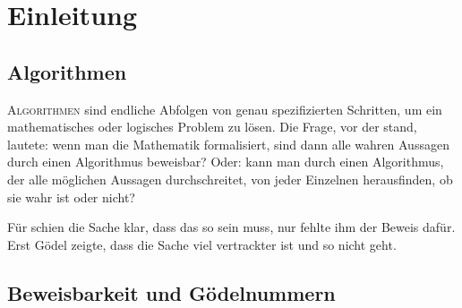 \section*{Einleitung}

\let\originalthefootnote\thefootnote
\renewcommand*{\thefootnote}{\fnsymbol{footnote}}

\subsection*{Algorithmen}

\lettrine[nindent=0em]{\color{purple}A}{lgorithmen} sind endliche Abfolgen von
genau spezifizierten Schritten, um ein mathematisches oder logisches Problem zu lösen. 
Die Frage, vor der  stand, lautete: wenn man die Mathematik formalisiert, 
sind dann alle wahren Aussagen durch einen Algorithmus beweisbar? Oder: kann man durch
einen Algorithmus, der alle möglichen Aussagen durchschreitet, von jeder Einzelnen
herausfinden, ob sie wahr ist oder nicht?

Für  schien die Sache klar, dass das so sein muss, nur fehlte ihm der Beweis
dafür. Erst Gödel zeigte, dass die Sache viel vertrackter ist und so nicht geht.

\subsection*{Beweisbarkeit und Gödelnummern}

